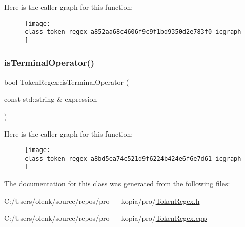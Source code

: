 Here is the caller graph for this function\+:
\nopagebreak
\begin{figure}[H]
\begin{center}
\leavevmode
\texttt{[image: class\_token\_regex\_a852aa68c4606f9c9f1bd9350d2e783f0\_icgraph]}
\end{center}
\end{figure}
\mbox{\label{class_token_regex_a8bd5ea74c521d9f6224b424e6f6e7d61}} 
\subsubsection{\texorpdfstring{isTerminalOperator()}{isTerminalOperator()}}
{\footnotesize\ttfamily bool Token\+Regex\+::is\+Terminal\+Operator (\begin{DoxyParamCaption}\item[{const std\+::string \&}]{expression }\end{DoxyParamCaption})}

Here is the caller graph for this function\+:
\nopagebreak
\begin{figure}[H]
\begin{center}
\leavevmode
\texttt{[image: class\_token\_regex\_a8bd5ea74c521d9f6224b424e6f6e7d61\_icgraph]}
\end{center}
\end{figure}


The documentation for this class was generated from the following files\+:\begin{DoxyCompactItemize}
\item 
C\+:/\+Users/olenk/source/repos/pro — kopia/pro/\mbox{\hyperlink{_token_regex_8h}{Token\+Regex.\+h}}\item 
C\+:/\+Users/olenk/source/repos/pro — kopia/pro/\mbox{\hyperlink{_token_regex_8cpp}{Token\+Regex.\+cpp}}\end{DoxyCompactItemize}
